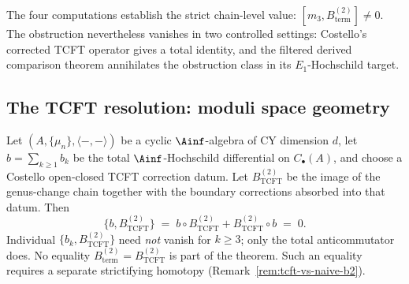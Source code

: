 The four computations establish the strict chain-level value:
$[m_3, B^{(2)}_{\mathrm{term}}] \neq 0$.  The obstruction
nevertheless vanishes in two controlled settings: Costello's
corrected TCFT operator gives a total identity, and the filtered
derived comparison theorem annihilates the obstruction class in
its $E_1$-Hochschild target.


\subsection{The TCFT resolution: moduli space geometry}
\label{subsec:tcft-resolution}

\begin{theorem}
\label{thm:total-ainf-compat}
Let $(A, \{\mu_n\}, \langle -,- \rangle)$ be a cyclic
$\Ainf$-algebra of CY dimension $d$, let
$b = \sum_{k \geq 1} b_k$ be the total $\Ainf$-Hochschild
differential on $C_\bullet(A)$, and choose a Costello
open-closed TCFT correction datum.  Let
$B^{(2)}_{\mathrm{TCFT}}$ be the image of the genus-change chain
together with the boundary corrections absorbed into that datum.
Then
\[
 \{b, B^{(2)}_{\mathrm{TCFT}}\}
 \;=\; b \circ B^{(2)}_{\mathrm{TCFT}}
 + B^{(2)}_{\mathrm{TCFT}} \circ b
 \;=\; 0.
\]
Individual $\{b_k, B^{(2)}_{\mathrm{TCFT}}\}$ need \emph{not}
vanish for $k \geq 3$; only the total anticommutator does.
No equality
$B^{(2)}_{\mathrm{term}}=B^{(2)}_{\mathrm{TCFT}}$ is part of
the theorem.  Such an equality requires a separate strictifying
homotopy (Remark~\ref{rem:tcft-vs-naive-b2}).
\end{theorem}


